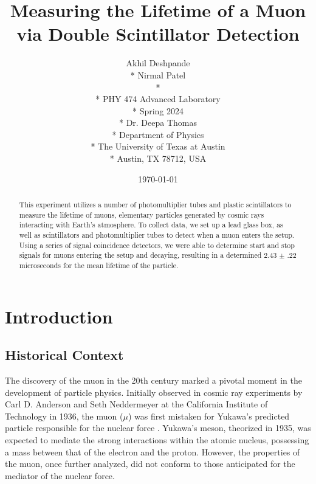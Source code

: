 \documentclass[10pt,letterpaper,onecolumn]{article}
\begin{document}

\title{Measuring the Lifetime of a Muon via Double Scintillator Detection}


\author{
 Akhil Deshpande \\*
 Nirmal Patel \\*
 \\*
 PHY 474 Advanced Laboratory \\*
 Spring 2024 \\*
 Dr. Deepa Thomas \\*
 Department of Physics \\*
 The University of Texas at Austin \\*
 Austin, TX 78712, USA\\
}
\date{\today}
\maketitle

\begin{abstract}
    This experiment utilizes a number of photomultiplier tubes and plastic scintillators to measure the lifetime of muons, elementary particles generated by cosmic rays interacting with Earth's atmosphere. To collect data, we set up a lead glass box, as well as scintillators and photomultiplier tubes to detect when a muon enters the setup. Using a series of signal coincidence detectors, we were able to determine start and stop signals for muons entering the setup and decaying, resulting in a determined 2.43 $\pm$ .22 microseconds for the mean lifetime of the particle.
\end{abstract}
\section{Introduction}
\subsection{Historical Context}
The discovery of the muon in the 20th century marked a pivotal moment in the development of particle physics. Initially observed in cosmic ray experiments by Carl D. Anderson and Seth Neddermeyer at the California Institute of Technology in 1936, the muon ($\mu$) was first mistaken for Yukawa's predicted particle responsible for the nuclear force \cite{StreetStevenson:1937}. Yukawa's meson, theorized in 1935, was expected to mediate the strong interactions within the atomic nucleus, possessing a mass between that of the electron and the proton. However, the properties of the muon, once further analyzed, did not conform to those anticipated for the mediator of the nuclear force. \cite{Yukawa1935}
\end{document}
